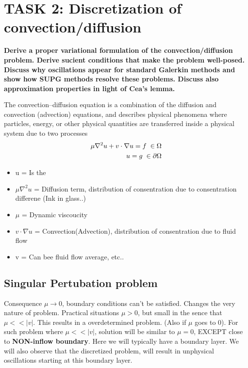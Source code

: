 \documentclass[a4paper,norsk]{article}
\begin{document}
\section*{TASK 2: Discretization of convection/diffusion}
\textbf{Derive a proper variational formulation of the convection/diffusion 
problem.  Derive sucient conditions that make the problem well-posed.  Discuss
why oscillations appear for standard Galerkin methods and show how SUPG
methods resolve these problems.  Discuss also approximation properties in
light of Cea's lemma.}\newline \newline

The convection–diffusion equation is a combination of the diffusion and convection (advection) equations, and describes physical phenomena where particles, energy, or other physical quantities are transferred inside a physical system due to two processes
\begin{align*}
\mu \nabla^2 u +v \cdot \nabla u = f \hspace{1mm} \in \Omega \\
u = g \hspace{1mm} \in \partial \Omega
\end{align*}

\begin{itemize}
\item u = Is the 
\item $\mu \nabla^2 u$ = Diffusion term, distribution of consentration due to consentration differene (Ink in glass..)
\item $\mu$ = Dynamic viscoucity
\item $v \cdot \nabla u $ = Convection(Advection), distribution of consentration due to fluid flow
\item v = Can bee fluid flow average, etc..
\end{itemize}

\subsection*{Singular Pertubation problem}
Consequence $\mu \rightarrow 0$, boundary conditions can't be satisfied. Changes the very nature of problem.
Practical situations $\mu > 0$, but small in the sence that $\mu << |v|$. This results in a overdetermined problem. (Also if $\mu$ goes to 0).
For such problem where $\mu << |v|$, solution will be similar to  $\mu = 0$, EXCEPT close to \textbf{NON-inflow boundary}. Here we will typically have a boundary layer.
We will also observe that the discretized problem, will result in unphysical oscillations starting at this boundary layer.
\end{document}
